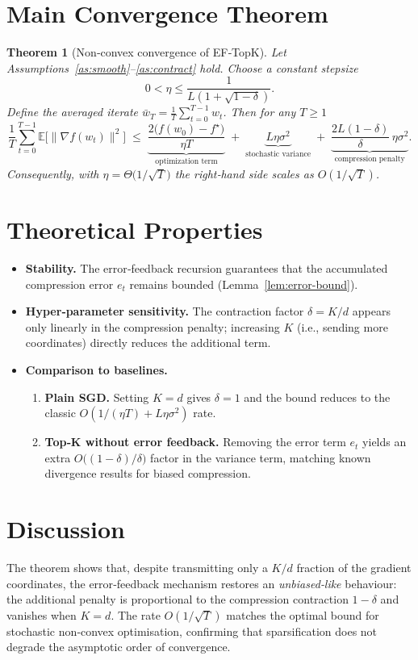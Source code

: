 \documentclass{article}
\newtheorem{theorem}{Theorem}
\newcommand{\E}{\mathbb{E}}
\begin{document}
\section*{Main Convergence Theorem}
\begin{theorem}[Non‑convex convergence of EF‑TopK]\label{thm:main}
Let Assumptions~\ref{as:smooth}–\ref{as:contract} hold.  
Choose a constant stepsize
\[
    0<\eta\le \frac{1}{L(1+\sqrt{1-\delta})}.
\]
Define the averaged iterate $\bar w_{T}= \frac{1}{T}\sum_{t=0}^{T-1} w_{t}$.  
Then for any $T\ge1$
\[
\frac{1}{T}\sum_{t=0}^{T-1}\E\bigl[\|\nabla f(w_{t})\|^{2}\bigr]
\;\le\;
\underbrace{\frac{2\bigl(f(w_{0})-f^{\star}\bigr)}{\eta T}}_{\text{optimization term}}
\;+\;
\underbrace{L\eta\sigma^{2}}_{\text{stochastic variance}}
\;+\;
\underbrace{\frac{2L(1-\delta)}{\delta}\,\eta\sigma^{2}}_{\text{compression penalty}}.
\]
Consequently, with $\eta =\Theta\!\bigl(1/\sqrt{T}\bigr)$ the right‑hand side scales as $O(1/\sqrt{T})$.
\end{theorem}

\section*{Theoretical Properties}
\begin{itemize}[leftmargin=*]
    \item \textbf{Stability.} The error‑feedback recursion guarantees that the accumulated compression error $e_{t}$ remains bounded (Lemma~\ref{lem:error-bound}).
    \item \textbf{Hyper‑parameter sensitivity.} The contraction factor $\delta=K/d$ appears only linearly in the compression penalty; increasing $K$ (i.e., sending more coordinates) directly reduces the additional term.
    \item \textbf{Comparison to baselines.}
    \begin{enumerate}
        \item \textbf{Plain SGD.} Setting $K=d$ gives $\delta=1$ and the bound reduces to the classic $O(1/(\eta T)+L\eta\sigma^{2})$ rate.
        \item \textbf{Top‑K without error feedback.} Removing the error term $e_{t}$ yields an extra $O\!\bigl((1-\delta)/\delta\bigr)$ factor in the variance term, matching known divergence results for biased compression.
    \end{enumerate}
\end{itemize}
\section*{Discussion}
The theorem shows that, despite transmitting only a $K/d$ fraction of the gradient coordinates, the error‑feedback mechanism restores an \emph{unbiased‑like} behaviour: the additional penalty is proportional to the compression contraction $1-\delta$ and vanishes when $K=d$. The rate $O(1/\sqrt{T})$ matches the optimal bound for stochastic non‑convex optimisation, confirming that sparsification does not degrade the asymptotic order of convergence.
\end{document}
